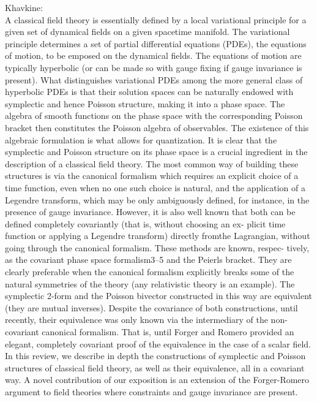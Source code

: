 \documentclass[Main]{subfiles}
\begin{document}
\begin{Warning}
Khavkine:\\

A classical field theory is essentially defined by a local variational principle for a given set of dynamical fields on a given spacetime manifold. 
The variational principle determines a set of partial differential equations (PDEs), the equations of motion, to be emposed on the dynamical fields. 
The equations of motion are typically hyperbolic (or can be made so with gauge fixing if gauge invariance is present).
What distinguishes variational PDEs among the more general class of hyperbolic PDEs is that their solution spaces can be naturally endowed with symplectic and hence Poisson structure, making it into a phase space. 
The algebra of smooth functions on the phase space with the corresponding Poisson bracket then constitutes the Poisson algebra of observables. The existence of this algebraic formulation is what allows for quantization. It is clear that the symplectic and Poisson structure on its phase space is a crucial ingredient in the description of a classical field theory. 
The most common way of building these structures is via the canonical formalism which requires an explicit choice of a time function, even when no one such choice is natural, and the application of a Legendre transform, which may be only ambiguously defined, for instance, in the presence of gauge invariance. 
However, it is also well known that both can be defined completely covariantly (that is, without choosing an ex- plicit time function or applying a Legendre transform) directly fromthe Lagrangian, without going through the canonical formalism. 
These methods are known, respec- tively, as the covariant phase space formalism3–5 and the Peierls bracket. 
They are clearly preferable when the canonical formalism explicitly breaks some of the natural symmetries of the theory (any relativistic theory is an example). 
The symplectic 2-form and the Poisson bivector constructed in this way are equivalent (they are mutual inverses). 
Despite the covariance of both constructions, until recently, their equivalence was only known via the intermediary of the non-covariant canonical formalism. 
That is, until Forger and Romero provided an elegant, completely covariant proof of the equivalence in the case of a scalar field.
In this review, we describe in depth the constructions of symplectic and Poisson structures of classical field theory, as well as their equivalence, all in a covariant way. 
A novel contribution of our exposition is an extension of the Forger-Romero argument to field theories where constraints and gauge invariance are present. 

\end{Warning}
\end{document}

